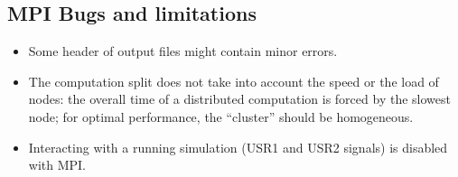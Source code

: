 \subsection{MPI Bugs and limitations}

\begin{itemize}
\item Some header of output files might contain minor errors.
\item The computation split does not take into account the speed or the
  load of nodes: the overall time of a distributed computation is
  forced by the slowest node; for optimal performance, the ``cluster''
  should be homogeneous.
\item Interacting with a running simulation (USR1 and USR2 signals) is disabled
  with MPI.
\end{itemize}

